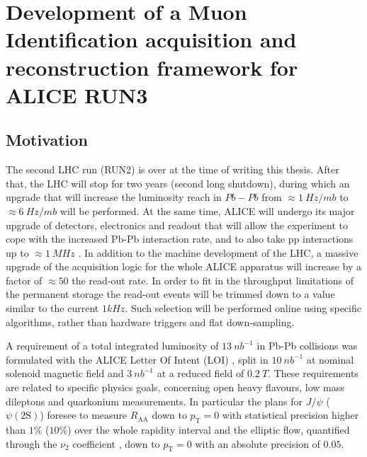 \chapter{Development of a Muon Identification acquisition and reconstruction framework for ALICE RUN3}

\section{Motivation}
The second LHC run (RUN2) is over at the time of writing this thesis.
After that, the LHC will stop for two years (second long shutdown), during which an upgrade that will increase the luminosity reach in $Pb-Pb$ from $\approx 1\ Hz/mb$ to $\approx6\ Hz/mb$ will be performed.
At the same time, ALICE will undergo its major upgrade of detectors, electronics and readout that will allow the experiment to cope with the increased Pb-Pb interaction rate, and to also take pp interactions up to $\approx1\ MHz$ \cite{Abelev:1625842, CERN-LHCC-2013-020, CERN-LHCC-2015-001, Antonioli:1603472, Buncic:2011297}.
In addition to the machine development of the LHC, a massive upgrade of the acquisition logic for the whole ALICE apparatus will increase by a factor of $\approx50$ the read-out rate.
In order to fit in the throughput limitations of the permanent storage the read-out events will be trimmed down to a value similar to the current $1kHz$.
Such selection will be performed online using specific algorithms, rather than hardware triggers and flat down-sampling.

A requirement of a total integrated luminosity of $13\ nb^{-1}$ in Pb-Pb collisions was formulated with the ALICE Letter Of Intent (LOI) \cite{ALICE_LOI}, split in $10\ nb^{-1}$ at nominal solenoid magnetic field and $3\ nb^{-1}$ at a reduced field of $0.2\ T$.
These requirements are related to specific physics goals, concerning open heavy flavours, low mass dileptons and quarkonium measurements.
In particular the plans for $J/\psi$ ($\psi(\mathrm{2S})$) foresee to measure $R_{\mathrm{AA}}$ down to $p_{\mathrm{T}} = 0$ with statistical precision higher than $1\%$ ($10\%$) over the whole rapidity interval and the elliptic flow, quantified through the $\nu_2$ coefficient \cite{Acharya:2017tgv}, down to $p_{\mathrm{T}} = 0$ with an absolute precision of $0.05$.

